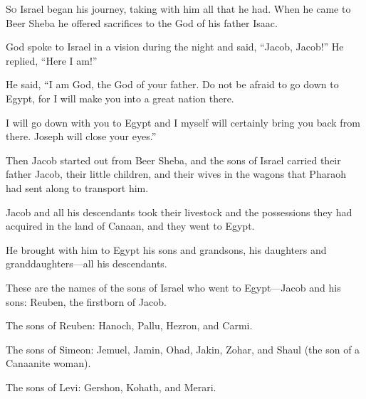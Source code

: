\begin{scripture}
 \allowchapbreak\hypertarget{ch-genesis-46}{}\lettrine[lines=5]{\color{pentateuch}S}{\textsc{o}} Israel began his journey, taking with him all that he had. When he came to Beer Sheba he offered sacrifices to the God of his father Isaac.\everypar{}
 God spoke to Israel in a vision during the night and said, ``Jacob, Jacob!'' He replied, ``Here I am!''
 He said, ``I am God, the God of your father. Do not be afraid to go down to Egypt, for I will make you into a great nation there.
 I will go down with you to Egypt and I myself will certainly bring you back from there. Joseph will close your eyes.''
\everypar{}

 Then Jacob started out from Beer Sheba, and the sons of Israel carried their father Jacob, their little children, and their wives in the wagons that Pharaoh had sent along to transport him.
 Jacob and all his descendants took their livestock and the possessions they had acquired in the land of Canaan, and they went to Egypt.
 He brought with him to Egypt his sons and grandsons, his daughters and granddaughters---all his descendants.
\everypar{}

 These are the names of the sons of Israel who went to Egypt---Jacob and his sons: Reuben, the firstborn of Jacob.
\everypar{}

 The sons of Reuben: Hanoch, Pallu, Hezron, and Carmi.
\everypar{}

 The sons of Simeon: Jemuel, Jamin, Ohad, Jakin, Zohar, and Shaul (the son of a Canaanite woman).
\everypar{}

 The sons of Levi: Gershon, Kohath, and Merari.
\everypar{}


\end{scripture}
